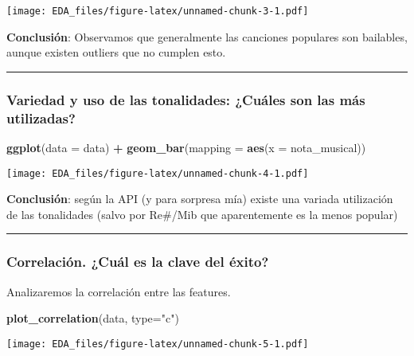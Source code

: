 \documentclass[]{article}
\newenvironment{Shaded}{\begin{snugshade}}{\end{snugshade}}
\newcommand{\KeywordTok}[1]{\textcolor[rgb]{0.13,0.29,0.53}{\textbf{#1}}}
\newcommand{\DataTypeTok}[1]{\textcolor[rgb]{0.13,0.29,0.53}{#1}}
\newcommand{\StringTok}[1]{\textcolor[rgb]{0.31,0.60,0.02}{#1}}
\newcommand{\OperatorTok}[1]{\textcolor[rgb]{0.81,0.36,0.00}{\textbf{#1}}}
\newcommand{\NormalTok}[1]{#1}
\begin{document}
\texttt{[image: EDA\_files/figure-latex/unnamed-chunk-3-1.pdf]}

\textbf{Conclusión}: Observamos que generalmente las canciones populares
son bailables, aunque existen outliers que no cumplen esto.

\begin{center}\rule{0.5\linewidth}{\linethickness}\end{center}

\subsubsection{Variedad y uso de las tonalidades: ¿Cuáles son las más
utilizadas?}\label{variedad-y-uso-de-las-tonalidades-cuales-son-las-mas-utilizadas}

\begin{Shaded}
\begin{Highlighting}[]
\KeywordTok{ggplot}\NormalTok{(}\DataTypeTok{data =}\NormalTok{ data) }\OperatorTok{+}
\StringTok{  }\KeywordTok{geom_bar}\NormalTok{(}\DataTypeTok{mapping =} \KeywordTok{aes}\NormalTok{(}\DataTypeTok{x =}\NormalTok{ nota_musical))}
\end{Highlighting}
\end{Shaded}

\texttt{[image: EDA\_files/figure-latex/unnamed-chunk-4-1.pdf]}

\textbf{Conclusión}: según la API (y para sorpresa mía) existe una
variada utilización de las tonalidades (salvo por Re\#/Mib que
aparentemente es la menos popular)

\begin{center}\rule{0.5\linewidth}{\linethickness}\end{center}

\subsubsection{Correlación. ¿Cuál es la clave del
éxito?}\label{correlacion.-cual-es-la-clave-del-exito}

Analizaremos la correlación entre las features.

\begin{Shaded}
\begin{Highlighting}[]
\KeywordTok{plot_correlation}\NormalTok{(data, }\DataTypeTok{type=}\StringTok{"c"}\NormalTok{)}
\end{Highlighting}
\end{Shaded}

\texttt{[image: EDA\_files/figure-latex/unnamed-chunk-5-1.pdf]}
\end{document}
